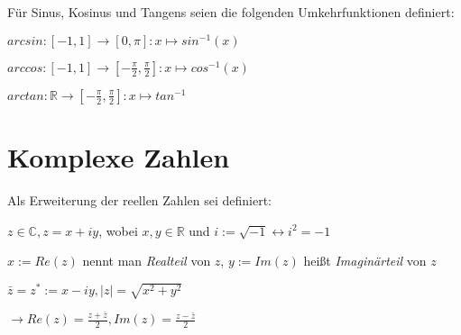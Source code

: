 \documentclass[]{article}
\begin{document}
\begin{definition}[Umkehrfunktionen]
Für Sinus, Kosinus und Tangens seien die folgenden Umkehrfunktionen definiert:
	\begin{multicols}{2}
		
	
			\begin{description}[noitemsep]
				\item $arcsin : [-1,1] \rightarrow [0, \pi] : x \mapsto sin^{-1}(x) $
				\item $arccos : [-1,1] \rightarrow [-\frac{\pi}{2},\frac{\pi}{2}] : x \mapsto cos^{-1}(x) $
				\item $arctan : \mathbb{R} \rightarrow [-\frac{\pi}{2},\frac{\pi}{2}] : x \mapsto tan^{-1} $
			\end{description}
	
	\end{multicols}
\end{definition}

\section{Komplexe Zahlen}

\begin{definition}
	Als Erweiterung der reellen Zahlen sei definiert:
	\begin{description}[noitemsep]
		\item $z \in \mathbb{C}, z = x + iy$, wobei $x,y \in \mathbb{R}$ und $i := \sqrt{-1} \leftrightarrow i^2 = -1$
		\item $x := Re(z)$ nennt man \emph{Realteil} von $z$, $y := Im(z)$ heißt \emph{Imaginärteil} von $z$
		\item $\bar{z} = z^* := x - iy, |z| = \sqrt{x^2 + y^2}$
		\item $\rightarrow Re(z) = \frac{z + \bar{z}}{2}, Im(z) = \frac{z - \bar{z}}{2}$
	\end{description}
\end{definition}
\end{document}
